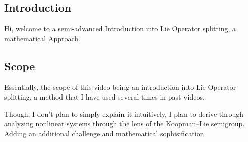 \subsection{Introduction}

Hi, welcome to a semi-advanced Introduction into Lie Operator splitting, a mathematical Approach.

\subsection{Scope}

Essentially, the scope of this video being an introduction into Lie Operator splitting, a method that I have used several times in past videos.

Though, I don't plan to simply explain it intuitively, I plan to derive through analyzing nonlinear systems through the lens of the Koopman–Lie semigroup. Adding an additional challenge and mathematical sophisification.
